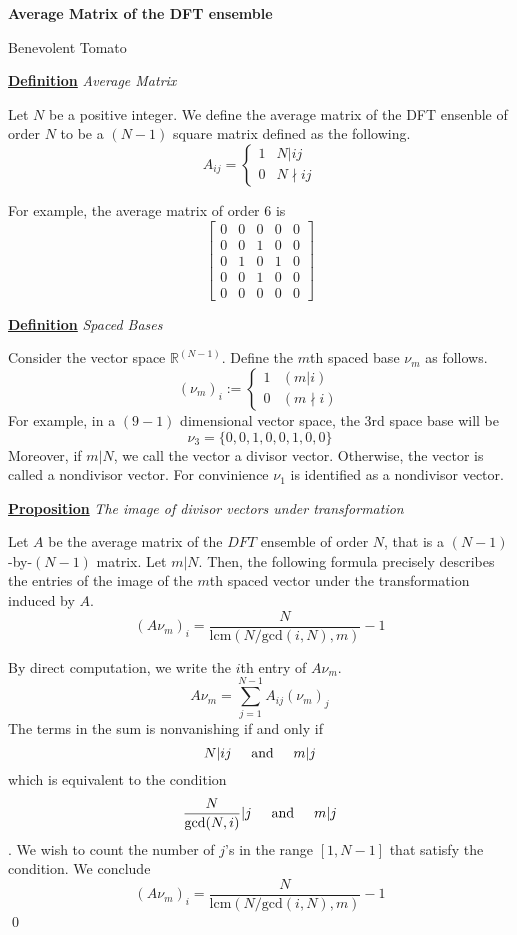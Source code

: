 \documentclass{article}
\newcommand{\new}[2]{
    \vspace{2mm}
    \noindent
    \textbf{
    \underline{#1}}
    \textit{
        {#2}
    }
    \vspace{2mm}
    \newline
}
\newcommand{\textAnd}{
    {
        \hspace{5mm}
        \textrm{and}
        \hspace{5mm}
    }
}
\begin{document}
\begin{center}
    \Large
    \textbf{Average Matrix of the DFT ensemble}

    \large
    Benevolent Tomato
\end{center}

\new{Definition} {Average Matrix}
Let $N$ be a positive integer. We define the 
average matrix of the DFT ensenble of order $N$ 
to be a $(N-1)$ square matrix defined 
as the following. 
\[
A_{ij} = \begin{cases}
    1 & N|ij \\ 
    0 & N \nmid ij
\end{cases}
\]

For example, the average matrix of order 6 is 
\[
\begin{bmatrix}
    0 &0&0& 0& 0 \\
    0 &0&1& 0& 0\\
    0 &1&0&1&0\\
    0&0&1&0&0\\
    0&0&0&0&0 
\end{bmatrix}
\]


\new{Definition} {Spaced Bases}
Consider the vector space $\mathbb{R}^{(N-1)}$. 
Define the $m$th spaced base $\nu_m$ as follows. 
\[
    (\nu_m)_i := \begin{cases}
        1 & (m|i) \\ 
        0 & (m \nmid i)
    \end{cases}
\]
For example, in a $(9-1)$ dimensional vector space, 
the 3rd space base will be 
\[
    \nu_3 = \{0, 0, 1, 0, 0, 1, 0, 0\}
\]
Moreover, if $m|N$, we call the vector a divisor vector.
Otherwise, the vector is called a nondivisor vector.  
For convinience $\nu_1$ is identified as a nondivisor vector. 

\new{Proposition} {The image of divisor vectors
under transformation}
Let $A$ be the average matrix of the $DFT$ ensemble of 
order $N$, that is a $(N-1)$-by-$(N-1)$ matrix. Let 
$m|N$. Then, the following formula precisely describes the 
entries of the image of the $m$th spaced vector under the transformation 
induced by $A$. 
\[
    (A \nu_m)_i = \frac N 
    {\text{lcm}(N/\text{gcd}(i, N), m)} - 1
\]

\proof 
By direct computation, we write the $i$th entry of $A\nu_m$. 
\[
    A \nu_m = \sum_{j = 1}^{N - 1} A_{ij} (\nu_m)_j
\]
The terms in the sum is nonvanishing if and only if 
\[
    N|ij \textAnd m|j
\]
which is equivalent to the condition 
\[
    \frac N {\text{gcd}(N, i)} | j 
    \textAnd 
    m | j
\]
. We wish to count the number of $j$'s in the range $[1, N-1]$ 
that satisfy the condition. We conclude
\[
    (A \nu_m)_i = \frac N 
    {\text{lcm}(N/\text{gcd}(i, N), m)} - 1
\] \qed \hfill
\end{document}
